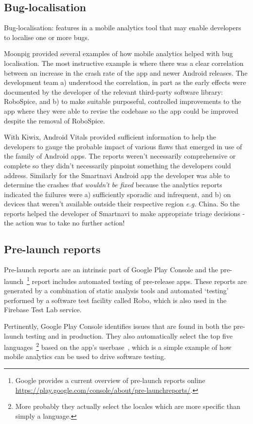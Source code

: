 \subsection{Bug-localisation}
Bug-localisation: features in a mobile analytics tool that may enable developers to localise one or more bugs.

Moonpig provided several examples of how mobile analytics helped with bug localisation. The most instructive example is where there was a clear correlation between an increase in the crash rate of the app and newer Android releases. The development team a) understood the correlation, in part as the early effects were documented by the developer of the relevant third-party software library: RoboSpice, and b) to make suitable purposeful, controlled improvements to the app where they were able to revise the codebase so the app could be improved despite the removal of RoboSpice.

With Kiwix, Android Vitals provided sufficient information to help the developers to gauge the probable impact of various flaws that emerged in use of the family of Android apps. The reports weren't necessarily comprehensive or complete so they didn't necessarily pinpoint something the developers could address. Similarly for the Smartnavi Android app the developer was able to determine the crashes \emph{that wouldn't be fixed} because the analytics reports indicated the failures were a) sufficiently sporadic and infrequent, and b) on devices that weren't available outside their respective region \emph{e.g.} China. So the reports helped the developer of Smartnavi to make appropriate triage decisions - the action was to take no further action! 

\subsection{Pre-launch reports}
Pre-launch reports are an intrinsic part of Google Play Console and the pre-launch~\footnote{Google provides a current overview of pre-launch reports online \url{https://play.google.com/console/about/pre-launchreports/}.} report includes automated testing of pre-release apps. These reports are generated by a combination of static analysis tools and automated `testing' performed by a software test facility called Robo, which is also used in the Firebase Test Lab service.

Pertinently, Google Play Console identifies issues that are found in both the pre-launch testing and in production. They also automatically select the top five languages~\footnote{More probably they actually select the locales which are more specific than simply a language.} based on the app's userbase~\citep{play_console_use_a_pre_launch_report_to_identify_issues_2022}, which is a simple example of how mobile analytics can be used to drive software testing.

